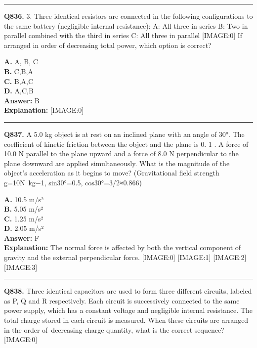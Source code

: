 \documentclass[12pt]{article}
\begin{document}
\hrule
\vspace{1em}


\noindent
\textbf{Q836.} 3.
Three identical resistors are connected in the following configurations to the same battery (negligible internal resistance):
\cdot 
A: All three in series
\cdot 
B: Two in parallel combined with the third in series
\cdot 
C: All three in parallel
[IMAGE:0]
If arranged in order of
decreasing
total power, which option is correct?



\textbf{A.} A, B, C \\
\textbf{B.} C,B,A \\
\textbf{C.} B,A,C \\
\textbf{D.} A,C,B \\

\textbf{Answer:} B \\
\textbf{Explanation:} [IMAGE:0]

\hrule
\vspace{1em}


\noindent
\textbf{Q837.} A 5.0 kg object is at rest on an inclined plane with an angle of 30°. The coefficient of kinetic friction between the object and the plane is 0.
1
. A force of 10.0 N parallel to the plane upward and a force of 8.0 N perpendicular to the plane downward are applied simultaneously. What is the magnitude of the object's acceleration as it begins to move? (Gravitational field strength g=10N kg−1, sin30°=0.5, cos30°=3​/2≈0.866)



\textbf{A.} 10.5 m/s² \\
\textbf{B.} 5.05 m/s² \\
\textbf{C.} 1.25 m/s² \\
\textbf{D.} 2.05 m/s² \\

\textbf{Answer:} F \\
\textbf{Explanation:} The normal force is affected by both the vertical component of gravity and the external perpendicular force.
[IMAGE:0]
[IMAGE:1]
[IMAGE:2]
[IMAGE:3]

\hrule
\vspace{1em}


\noindent
\textbf{Q838.} Three identical capacitors are used to form three different circuits, labeled as P, Q and R respectively. Each circuit is successively connected to the same power supply, which has a constant voltage and negligible internal resistance. The total charge stored in each circuit is measured. When these circuits are arranged in the order of decreasing charge quantity, what is the correct sequence?
[IMAGE:0]
\end{document}
